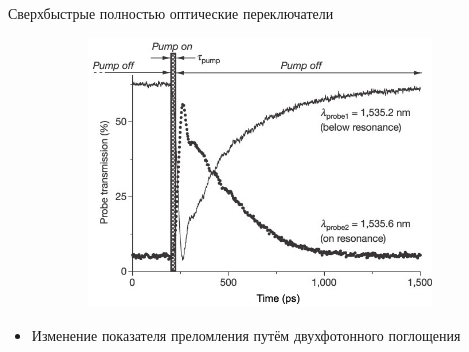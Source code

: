 \begin{frame}{Сверхбыстрые полностью оптические переключатели}
\begin{figure}
\begin{subfigure}{.65\textwidth}
			\includegraphics[width=\textwidth]{img/ring_res_shift}
		\end{subfigure}
		\caption{}
	\end{figure}%
	\begin{itemize}
		\item Изменение показателя преломления путём двухфотонного поглощения
	\end{itemize}
\end{frame}